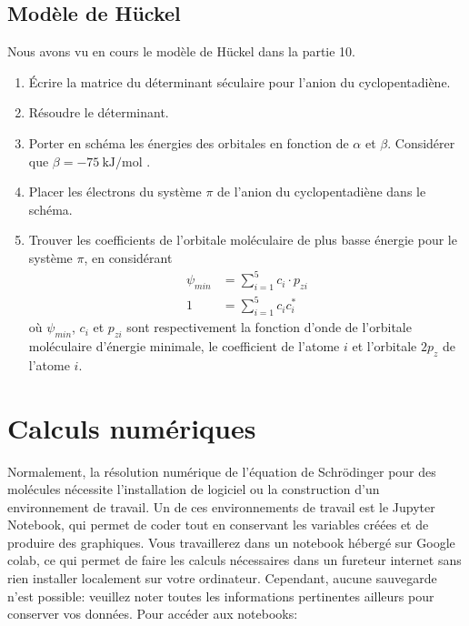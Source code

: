 \documentclass[12pt,letterpaper]{article}
\begin{document}
\subsection*{Modèle de Hückel}

Nous avons vu en cours le modèle de Hückel dans la partie 10.
\begin{enumerate}[resume]
\item Écrire la matrice du déterminant séculaire pour l'anion du cyclopentadiène.
\item Résoudre le déterminant.
\item Porter en schéma les énergies des orbitales en fonction de $\alpha$ et $\beta$. Considérer que $\beta=\SI{-75}{\kilo\joule\per\mole}$ \cite{mcquarrie}.
\item Placer les électrons du système $\pi$ de l'anion du cyclopentadiène dans le schéma.
\item Trouver les coefficients de l'orbitale moléculaire de plus basse énergie pour le système $\pi$, en considérant
\begin{align}
\psi_{min} &= \sum^{5}_{i=1} c_i \cdot p_{zi} \\
1 &= \sum^{5}_{i=1} c_i c_i^*
\end{align}
où $\psi_{min}$, $c_i$ et $p_{zi}$ sont respectivement la fonction d'onde de l'orbitale moléculaire d'énergie minimale, le coefficient de l'atome $i$ et l'orbitale $2p_z$ de l'atome $i$. 
\end{enumerate}

\section*{Calculs numériques}

Normalement, la résolution numérique de l'équation de Schrödinger pour des molécules nécessite l'installation de logiciel ou la construction d'un environnement de travail. Un de ces environnements de travail est le Jupyter Notebook, qui permet de coder tout en conservant les variables créées et de produire des graphiques. Vous travaillerez dans un notebook hébergé sur Google colab, ce qui permet de faire les calculs nécessaires dans un fureteur internet sans rien installer localement sur votre ordinateur. Cependant, aucune sauvegarde n'est possible: veuillez noter toutes les informations pertinentes ailleurs pour conserver vos données. Pour accéder aux notebooks:
\end{document}
